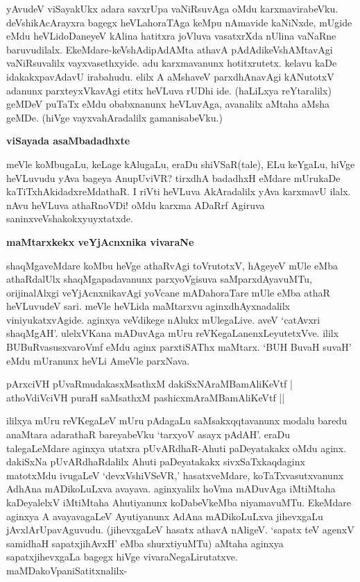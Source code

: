 \noindent
yAvudeV viSayakUkx adara savxrUpa vaNiRsuvAga oMdu karxmavirabeVku. 
deVshikAcArayxra bagegx heVLahoraTAga keMpu nAmavide 
kaNiNxde, mUgide eMdu heVLidoDaneyeV kAlina hatitxra joVluva vasatxrXda nUlina vaNaRne baruvudilalx. EkeMdare-keVshAdipAdAMta athavA pAdAdikeVshAMtavAgi vaNiRsuvalilx vayxvasethxyide. adu karxmavanunx hotitxrutetx. kelavu kaDe idakakxpavAdavU irabahudu. elilx A aMshaveV parxdhAnavAgi kANutotxV adanunx parxteyxVkavAgi etitx heVLuva rUDhi ide. (haLiLxya reYtaralilx) geMDeV puTaTx eMdu obabxnanunx heVLuvAga, avanalilx aMtaha aMsha geMDe. (hiVge vayxvahAradalilx gamanisabeVku.)

{\bigskip
\noindent
{\large\bf viSayada asaMbadadhxte}}\label{page115}
\medskip

\noindent
meVle koMbugaLu, keLage kAlugaLu, eraDu shiVSaR(tale), ELu keYgaLu, hiVge heVLuvudu yAva bageya AnupUviVR? tirxdhA badadhxH eMdare mUrukaDe kaTiTxhAkidadxreMdathaR. I riVti heVLuva AkAradalilx yAva karxmavU ilalx. nAvu heVLuva athaRnoVDi! oMdu karxma ADaRrf Agiruva saninxveVshakokxyuyxtatxde.

{\bigskip
\noindent
{\large\bf maMtarxkekx veYjAcnxnika vivaraNe}}\label{page115a}
\medskip

\noindent
shaqMgaveMdare koMbu heVge athaRvAgi toVrutotxV, hAgeyeV mUle eMba athaRdalUlx shaqMgapadavanunx parxyoVgisuva saMparxdAyavuMTu, orijinalAlxgi veYjAcnxnikavAgi yoVcane mADahoraTare mUle eMba athaR heVLuvudeV sari. meVle heVLida maMtarxvu aginxdhAyxnadalilx viniyukatxvAgide. aginxya veVdikege nAlukx mUlegaLive. aveV `catAvxri shaqMgAH'. ulelxVKana mADuvAga mUru reVKegaLanenxLeyutetxVve. ililx BUBuRvasusxvaroVmf eMdu aginx parxtiSAThx maMtarx. `BUH BuvaH suvaH' eMdu mUranunx heVLi AmeVle parxNava.

\begin{shloka}
pArxciVH pUvaRmudakasxMsathxM dakiSxNAraMBamAliKeVtf |\\\label{115}
athoVdiVciVH puraH saMsathxM pashicxmAraMBamAliKeVtf ||
\end{shloka}

ililxya mUru reVKegaLeV mUru pAdagaLu saMsakxqqtavanunx modalu baredu anaMtara adarathaR bareyabeVku `tarxyoV asayx pAdAH'. eraDu 
talegaLeMdare aginxya utatxra pUvARdhaR-Ahuti paDeyatakakx oMdu aginx. dakiSxNa pUvARdhaRdalilx Ahuti paDeyatakakx sivxSaTxkaqdaginx matotxMdu ivugaLeV `devxVshiVSeVR,' hasatxveMdare, koTaTxvasutxvanunx AdhAna mADikoLuLxva avayava. aginxyalilx hoVma mADuvAga iMtiMtaha kaDeyalelxV iMtiMtaha Ahutiyanunx koDabeVkeMba niyamavuMTu. EkeMdare aginxya A avayavagaLeV Ayutiyanunx AdAna mADikoLuLxva jihevxgaLu jAvxlArUpavAguvudu. (jihevxgaLeV hasatx athavA nAligeV. `sapatx teV agenxV samidhaH sapatxjihAvxH' eMba shurxtiyuMTu) aMtaha aginxya sapatxjihevxgaLa bagegx hiVge vivaraNegaLirutatxve. maMDakoVpaniSatitxnalilx-

